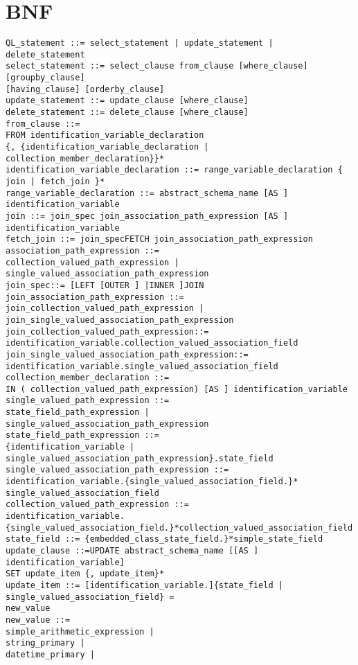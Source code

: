 \documentclass[11pt,a4paper]{report}
\begin{document}
\section{BNF}
\begin{verbatim}
QL_statement ::= select_statement | update_statement | delete_statement
select_statement ::= select_clause from_clause [where_clause] [groupby_clause]
[having_clause] [orderby_clause]
update_statement ::= update_clause [where_clause]
delete_statement ::= delete_clause [where_clause]
from_clause ::=
FROM identification_variable_declaration
{, {identification_variable_declaration | collection_member_declaration}}*
identification_variable_declaration ::= range_variable_declaration { join | fetch_join }*
range_variable_declaration ::= abstract_schema_name [AS ] identification_variable
join ::= join_spec join_association_path_expression [AS ] identification_variable
fetch_join ::= join_specFETCH join_association_path_expression
association_path_expression ::=
collection_valued_path_expression | single_valued_association_path_expression
join_spec::= [LEFT [OUTER ] |INNER ]JOIN
join_association_path_expression ::= join_collection_valued_path_expression |
join_single_valued_association_path_expression
join_collection_valued_path_expression::=
identification_variable.collection_valued_association_field
join_single_valued_association_path_expression::=
identification_variable.single_valued_association_field
collection_member_declaration ::=
IN ( collection_valued_path_expression) [AS ] identification_variable
single_valued_path_expression ::=
state_field_path_expression | single_valued_association_path_expression
state_field_path_expression ::=
{identification_variable | single_valued_association_path_expression}.state_field
single_valued_association_path_expression ::=
identification_variable.{single_valued_association_field.}* single_valued_association_field
collection_valued_path_expression ::=
identification_variable.{single_valued_association_field.}*collection_valued_association_field
state_field ::= {embedded_class_state_field.}*simple_state_field
update_clause ::=UPDATE abstract_schema_name [[AS ] identification_variable]
SET update_item {, update_item}*
update_item ::= [identification_variable.]{state_field | single_valued_association_field} =
new_value
new_value ::=
simple_arithmetic_expression |
string_primary |
datetime_primary |


\end{verbatim}
\end{document}
